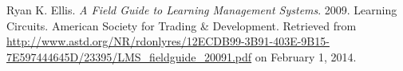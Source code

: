 \begin{thebibliography}{9} %


Ryan K. Ellis. \emph{A Field Guide to Learning Management Systems}. 2009.
Learning Circuits. American Society for Trading \& Development. Retrieved from
\url{http://www.astd.org/NR/rdonlyres/12ECDB99-3B91-403E-9B15-7E597444645D/23395/LMS_fieldguide_20091.pdf}
on February 1, 2014.

\end{thebibliography}

